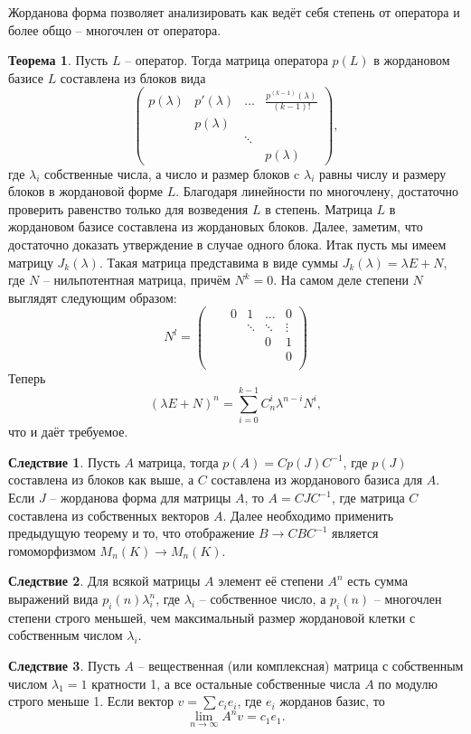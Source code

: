 \documentclass[10pt,a4paper,oneside]{book} %
\theoremstyle{definition}
\newtheorem{thm}{Теорема}
\newtheorem{cor}{Следствие}
\def\thrm{\begin{thm}}
\def\ethrm{\end{thm}}
\def\crl{\begin{cor}}
\def\ecrl{\end{cor}}
\def\pmat{\begin{pmatrix}}
\def\epmat{\end{pmatrix}}
\begin{document}
Жорданова форма позволяет анализировать как ведёт себя степень от оператора и более общо -- многочлен от оператора.

\thrm
Пусть $L$ -- оператор. Тогда матрица оператора $p(L)$ в жордановом базисе $L$ составлена из блоков вида
$$ \pmat p(\lambda) & p'(\lambda) & \dots & \frac{p^{(k-1)}(\lambda)}{(k-1)!}\\
 &  p(\lambda) & &\\
 &            & \ddots & \\
 &&&  p(\lambda) \epmat,$$
где $\lambda_i$ собственные числа, а число и размер блоков c $\lambda_i$ равны числу и размеру блоков в жордановой форме $L$.
\proof Благодаря линейности по многочлену, достаточно проверить равенство только для возведения $L$ в степень. Матрица $L$ в жордановом базисе составлена из жордановых блоков. Далее, заметим, что достаточно доказать утверждение в случае одного блока. Итак пусть мы имеем матрицу $J_k(\lambda)$. Такая матрица представима в виде суммы $J_k(\lambda)= \lambda E + N$, где $N$ -- нильпотентная матрица, причём $N^k=0$. На самом деле степени $N$ выглядят следующим образом:
$$N^l= \pmat  & &0& 1& \dots &0 \\
   & && \ddots &\ddots& \vdots\\
 &&&&0& 1\\
 &&&&& 0 \\
 &&&&&  \epmat $$
Теперь
$$(\lambda E+N)^n= \sum_{i=0}^{k-1} C_n^i\lambda^{n-i}N^i,$$
что и даёт требуемое.
\endproof
\ethrm

\crl Пусть $A$ матрица, тогда $p(A)=C p(J) C^{-1}$, где $p(J)$ составлена из блоков как выше, а $C$ составлена из жорданового базиса для $A$.
\proof Если $J$ -- жорданова форма для матрицы $A$, то $A=CJC^{-1}$, где матрица $C$ составлена из собственных векторов $A$. Далее необходимо применить предыдущую теорему и то, что отображение $B \to CBC^{-1}$ является гомоморфизмом $M_n(K) \to M_n(K)$.
\endproof
\ecrl

\crl Для всякой матрицы $A$ элемент её степени $A^n$ есть сумма выражений вида $p_i(n)\lambda_i^n$, где $\lambda_i$ -- собственное число, а $p_i(n)$ -- многочлен степени строго меньшей, чем максимальный размер жордановой клетки с собственным числом $\lambda_i$.
\ecrl

\crl Пусть $A$ -- вещественная (или комплексная) матрица с собственным числом $\lambda_1=1$ кратности 1, а все остальные собственные числа $A$ по модулю строго меньше 1. Если вектор $v= \sum c_i e_i$, где $e_i$ жорданов базис, то $$\lim_{n \to \infty}A^nv= c_1 e_1.$$
\ecrl
\end{document}
